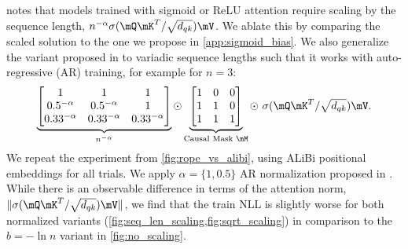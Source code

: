 \cite{wortsman2023replacing} notes that models trained with sigmoid or ReLU attention require scaling by the sequence length, $n^{-\alpha} \sigma(\mQ\mK^T / \sqrt{d_{qk}})\mV$. We ablate this by comparing the scaled solution to the one we propose in \cref{app:sigmoid_bias}. We also generalize the variant proposed in \citep{wortsman2023replacing} to variadic sequence lengths such that it works with auto-regressive (AR) training, for example for $n=3$:
\begin{align}
    \underbrace{\begin{bmatrix}
        1 & 1 & 1 \\
        0.5^{-\alpha} & 0.5^{-\alpha} & 1 \\
        0.33^{-\alpha} & 0.33^{-\alpha} & 0.33^{-\alpha} \\
    \end{bmatrix}}_{n^{-\alpha}} \odot
    \underbrace{\begin{bmatrix}
        1 & 0 & 0 \\
        1 & 1 & 0 \\
        1 & 1 & 1 \\
    \end{bmatrix}}_{\text{Causal Mask } \mM} \odot \   
     \sigma(\mQ \mK^T / \sqrt{d_{qk}}) \mV .
\label{eqn:ar_seq_len_normalization}
\end{align}
We repeat the experiment from \cref{fig:rope_vs_alibi}, using ALiBi positional embeddings for all trials. We apply $\alpha=\{1, 0.5\}$ AR normalization proposed in . While there is an observable difference in terms of the attention norm, $\lVert \sigma(\mQ \mK^T / \sqrt{d_{qk}}) \mV \rVert$, we find that the train NLL is slightly worse for both normalized variants (\cref{fig:seq_len_scaling,fig:sqrt_scaling}) in comparison to the $b = -\ln n$  variant in \cref{fig:no_scaling}.
